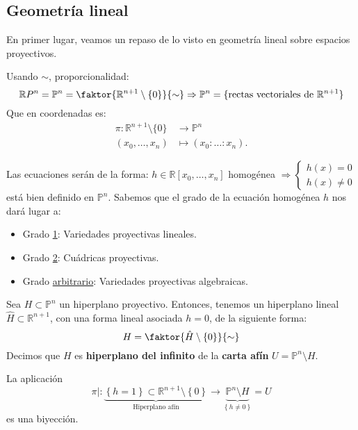\subsection{Geometría lineal}
\label{sub:geometría_lineal}
En primer lugar, veamos un repaso de lo visto en geometría lineal sobre espacios proyectivos.
\begin{defi}    
Usando $\sim$, proporcionalidad: 
\[
\mathbb{R}P^n = \mathbb{P}^{n} = \faktor{\mathbb{R}^{n+1}\setminus \{0\}}{\sim} \Rightarrow \mathbb{P}^{n} = \{\text{rectas vectoriales de } \mathbb{R}^{n+1}\}     
\]
Que en coordenadas es:
\begin{align*}
    \pi: \mathbb{R}^{n+1} \setminus \{0\} &\rightarrow \mathbb{P}^{n}\\
    \left( x_0, \ldots, x_n \right) &\mapsto \left( x_0 : \ldots : x_n \right) 
.\end{align*}
\end{defi}
\begin{obs}
Las ecuaciones serán de la forma: $h\in \mathbb{R}\left[ x_0, \ldots, x_n \right]$ homogénea $\Rightarrow \begin{cases}
    h\left( x \right) = 0\\
    h\left( x \right) \neq 0
\end{cases}$ está bien definido en $\mathbb{P}^{n}$.
Sabemos que el grado de la ecuación homogénea $h$ nos dará lugar a:
\begin{itemize}
    \item Grado \underline{1}: Variedades proyectivas lineales.
    \item Grado \underline{2}: Cuádricas proyectivas.
    \item Grado \underline{arbitrario}: Variedades proyectivas algebraicas.
\end{itemize}
\end{obs}

\begin{defi}
Sea $H \subset \mathbb{P}^n$ un hiperplano proyectivo. Entonces, tenemos un hiperplano lineal $\hat{H} \subset \mathbb{R}^{n+1}$, con una forma lineal asociada $h = 0$, de la siguiente forma:
\[
H = \faktor{\hat{H}\setminus \left\{ 0 \right\}}{\sim}
\]
Decimos que $H$ es \textbf{hiperplano del infinito} de la \textbf{carta afín} $U = \mathbb{P}^n \setminus H$.
\end{defi}
\begin{prop}
La aplicación 
\[
\pi|: \underbrace{\left\{ h = 1 \right\}\subset \mathbb{R}^{n+1} \setminus \left\{ 0 \right\}}_{\text{Hiperplano afín}} \rightarrow \underbrace{\mathbb{P}^{n} \setminus H}_{\left\{ h \neq 0 \right\}} = U
\]
es una biyección.
\end{prop}

